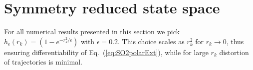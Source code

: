 \documentclass[aip,cha,showpacs,reprint]{revtex4-1} %
\newcommand{\bseq}{\begin{subequations}}
\newcommand{\eseq}{\end{subequations}}
\newcommand{\rf}     [1] {\cite{#1}}
\newcommand{\refeq}  [1] {Eq.~(\ref{#1})}                   %
\newcommand{\ii}{\ensuremath{\mathrm{i}}} %
\begin{document}


\section{Symmetry reduced state space}


For all numerical results presented in this section we pick
$h_\epsilon(r_k)=(1-e^{-r_k^2/\epsilon})$ with $\epsilon=0.2$. This choice
scales as $r_k^2$ for $r_k\rightarrow 0$, thus ensuring differentiability
of \refeq{eq:SO2polarExt}, while for large $r_k$ distortion of
trajectories is minimal.
\end{document}
